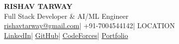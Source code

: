 \documentclass[a4paper,9.5pt]{article}
\begin{document}
\noindent\begin{minipage}[c]{0.79\textwidth}%
{\fontsize{15}{17}\bfseries\color{accentblue} RISHAV TARWAY}\\[1pt]
{\fontsize{9}{11}\color{darkgray} Full Stack Developer \& AI/ML Engineer}\\[3pt]
\fontsize{8.2}{10}\selectfont
\href{mailto:rishavtarway@gmail.com}{rishavtarway@gmail.com}\;|\;
+91-7004544142\;|\;
{{LOCATION}}\\[2pt]
\href{https://www.linkedin.com/in/rishav-tarway-fst/}{LinkedIn}\;|\;
\href{https://github.com/rishavtarway}{GitHub}\;|\;
\href{https://codeforces.com/profile/NeonMagic}{CodeForces}\;|\;
\href{https://my-portfolio-five-roan-36.vercel.app/}{Portfolio}%
\end{minipage}%
\hfill%

\vspace{2pt}
\end{document}
